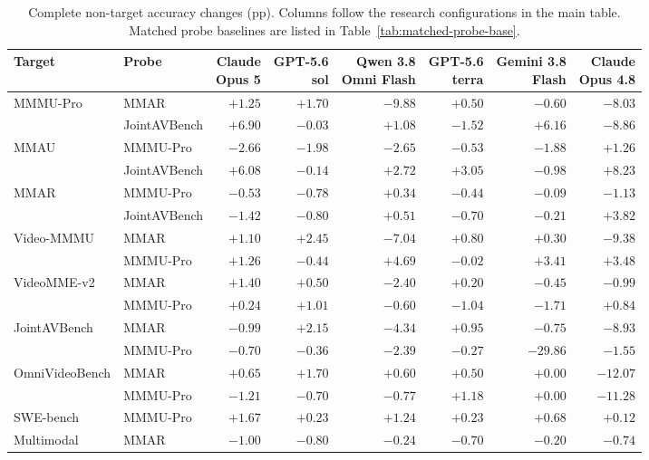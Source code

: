 \begin{table}[!htbp]
\miletablestyle
\begingroup
\fontsize{8}{9.5}\selectfont
\setlength{\tabcolsep}{2pt}
\caption{Complete non-target accuracy changes (pp). Columns follow the research configurations in the main table. Matched probe baselines are listed in Table~\ref{tab:matched-probe-base}.}
\label{tab:complete-nontarget}
\begin{tabular*}{\linewidth}{@{\extracolsep{\fill}}llrrrrrr@{}}
\toprule
Target & Probe & \shortstack{Claude\\Opus 5} & \shortstack{GPT-5.6\\sol} & \shortstack{Qwen 3.8\\Omni Flash} & \shortstack{GPT-5.6\\terra} & \shortstack{Gemini 3.8\\Flash} & \shortstack{Claude\\Opus 4.8} \\
\midrule
MMMU-Pro & MMAR & $+1.25$ & $+1.70$ & $-9.88$ & $+0.50$ & $-0.60$ & $-8.03$ \\
 & JointAVBench & $+6.90$ & $-0.03$ & $+1.08$ & $-1.52$ & $+6.16$ & $-8.86$ \\
\addlinespace[2pt]
MMAU & MMMU-Pro & $-2.66$ & $-1.98$ & $-2.65$ & $-0.53$ & $-1.88$ & $+1.26$ \\
 & JointAVBench & $+6.08$ & $-0.14$ & $+2.72$ & $+3.05$ & $-0.98$ & $+8.23$ \\
\addlinespace[2pt]
MMAR & MMMU-Pro & $-0.53$ & $-0.78$ & $+0.34$ & $-0.44$ & $-0.09$ & $-1.13$ \\
 & JointAVBench & $-1.42$ & $-0.80$ & $+0.51$ & $-0.70$ & $-0.21$ & $+3.82$ \\
\addlinespace[2pt]
Video-MMMU & MMAR & $+1.10$ & $+2.45$ & $-7.04$ & $+0.80$ & $+0.30$ & $-9.38$ \\
 & MMMU-Pro & $+1.26$ & $-0.44$ & $+4.69$ & $-0.02$ & $+3.41$ & $+3.48$ \\
\addlinespace[2pt]
VideoMME-v2 & MMAR & $+1.40$ & $+0.50$ & $-2.40$ & $+0.20$ & $-0.45$ & $-0.99$ \\
 & MMMU-Pro & $+0.24$ & $+1.01$ & $-0.60$ & $-1.04$ & $-1.71$ & $+0.84$ \\
\addlinespace[2pt]
JointAVBench & MMAR & $-0.99$ & $+2.15$ & $-4.34$ & $+0.95$ & $-0.75$ & $-8.93$ \\
 & MMMU-Pro & $-0.70$ & $-0.36$ & $-2.39$ & $-0.27$ & $-29.86$ & $-1.55$ \\
\addlinespace[2pt]
OmniVideoBench & MMAR & $+0.65$ & $+1.70$ & $+0.60$ & $+0.50$ & $+0.00$ & $-12.07$ \\
 & MMMU-Pro & $-1.21$ & $-0.70$ & $-0.77$ & $+1.18$ & $+0.00$ & $-11.28$ \\
\addlinespace[2pt]
SWE-bench & MMMU-Pro & $+1.67$ & $+0.23$ & $+1.24$ & $+0.23$ & $+0.68$ & $+0.12$ \\
Multimodal & MMAR & $-1.00$ & $-0.80$ & $-0.24$ & $-0.70$ & $-0.20$ & $-0.74$ \\
\bottomrule
\end{tabular*}
\endgroup
\end{table}

